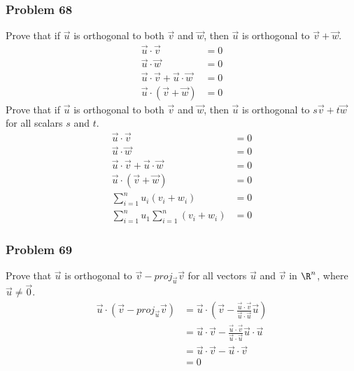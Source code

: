 \documentclass[letterpaper, 12pt]{math}
\begin{document}
\subsubsection*{Problem 68}
Prove that if \( \vec{u} \) is orthogonal to both \( \vec{v} \) and \( \vec{w}
\), then \( \vec{u} \) is orthogonal to \( \vec{v}+\vec{w} \).
\begin{align*}
  \vec{u}\cdot\vec{v} &= 0 \\
  \vec{u}\cdot\vec{w} &= 0 \\
  \vec{u}\cdot\vec{v}+\vec{u}\cdot\vec{w} &= 0 \\
  \vec{u}\cdot(\vec{v}+\vec{w}) &= 0
\end{align*}
Prove that if \( \vec{u} \) is orthogonal to both \( \vec{v} \) and \( \vec{w}
\), then \( \vec{u} \) is orthogonal to \( s\vec{v}+t\vec{w} \) for all
scalars \( s \) and \( t \).
\begin{align*}
  \vec{u}\cdot\vec{v} &= 0 \\
  \vec{u}\cdot\vec{w} &= 0 \\
  \vec{u}\cdot\vec{v}+\vec{u}\cdot\vec{w} &= 0 \\
  \vec{u}\cdot(\vec{v}+\vec{w}) &= 0 \\
  \sum_{i=1}^{n}u_i(v_i+w_i) &= 0 \\
  \sum_{i=1}^{n}u_1\sum_{i=1}^{n}(v_i+w_i) &= 0
\end{align*}

\subsubsection*{Problem 69}
Prove that \( \vec{u} \) is orthogonal to \( \vec{v}-proj_{\vec{u}}\vec{v} \)
for all vectors \( \vec{u} \) and \( \vec{v} \) in \( \R^n \), where
\( \vec{u}\ne\vec{0} \).
\begin{align*}
  \vec{u}\cdot(\vec{v}-proj_{\vec{u}}\vec{v}) &= \vec{u}\cdot(\vec{v}-
    \frac{\vec{u}\cdot\vec{v}}{\vec{u}\cdot\vec{u}}\vec{u}) \\
  &= \vec{u}\cdot\vec{v}-
    \frac{\vec{u}\cdot\vec{v}}{\vec{u}\cdot\vec{u}}\vec{u}\cdot\vec{u} \\
  &= \vec{u}\cdot\vec{v}-\vec{u}\cdot\vec{v} \\
  &= 0
\end{align*}
\end{document}
